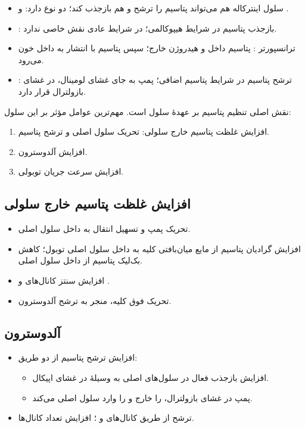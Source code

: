 \documentclass[11pt,a4paper]{article}
\begin{document}
\begin{itemize}
\item سلول اینترکاله هم می‌تواند پتاسیم را ترشح و هم بازجذب کند؛ دو نوع دارد:  و .
\item {}: بازجذب پتاسیم در شرایط هیپوکالمی؛ در شرایط عادی نقش خاصی ندارد.
\item ترانسپورتر : پتاسیم داخل و هیدروژن خارج؛ سپس پتاسیم با انتشار به داخل خون می‌رود.
\item {}: ترشح پتاسیم در شرایط پتاسیم اضافی؛ پمپ  به جای غشای لومینال، در غشای بازولترال قرار دارد.
\end{itemize}
نقش اصلی تنظیم پتاسیم بر عهدهٔ سلول  است. مهم‌ترین عوامل مؤثر بر این سلول:
\begin{enumerate}
\item افزایش غلظت پتاسیم خارج سلولی: تحریک سلول اصلی و ترشح پتاسیم.
\item افزایش آلدوسترون.
\item افزایش سرعت جریان توبولی.
\end{enumerate}
\subsection*{افزایش غلظت پتاسیم خارج سلولی}
\begin{itemize}
\item تحریک پمپ  و تسهیل انتقال  به داخل سلول اصلی.
\item افزایش گرادیان پتاسیم از مایع میان‌بافتی کلیه به داخل سلول اصلی توبول؛ کاهش بک‌لیک پتاسیم از داخل سلول اصلی.
\item افزایش سنتز کانال‌های  و .
\item تحریک فوق کلیه، منجر به ترشح آلدوسترون.
\end{itemize}
\subsection*{آلدوسترون}
\begin{itemize}
\item افزایش ترشح پتاسیم از دو طریق:
  \begin{itemize}
  \item افزایش بازجذب فعال  در سلول‌های اصلی به وسیلهٔ  در غشای اپیکال.
  \item پمپ  در غشای بازولترال،  را خارج و  را وارد سلول اصلی می‌کند.
  \end{itemize}
\item ترشح از طریق کانال‌های  و ؛ افزایش تعداد کانال‌ها.
\end{itemize}
\end{document}
